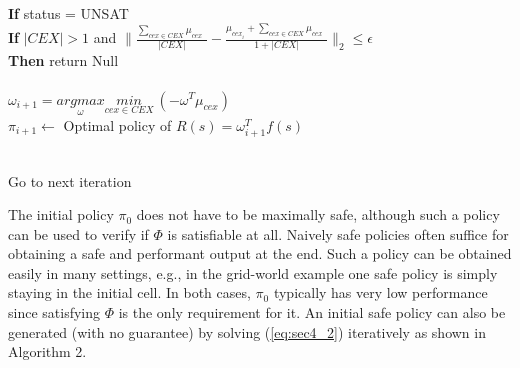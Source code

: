 \begin{algorithm}[htpb]
\begin{algorithmic}[1]
\\\qquad\qquad \textbf{If} status = UNSAT
\\\qquad\qquad\qquad \textbf{If} $|CEX|>1$ and $\|\frac{\underset{cex \in CEX}{\sum}\mu_{cex}\ \ }{|CEX|}-\frac{\mu_{cex_i} + \underset{cex \in CEX}{\sum}\mu_{cex}\ \ }{1 + |CEX|}\|_2\leq\epsilon$
\\\qquad\qquad\qquad\qquad  \textbf{Then} return Null\\
\\\qquad\qquad $\omega_{i+1} = \underset{\omega}{argmax} \underset{cex\in CEX}{min}\ (-\omega^T\mu_{cex})$
\\\qquad\qquad $\pi_{i+1}\gets$ Optimal policy of $R(s)=\omega_{i+1}^Tf(s)$

\\\qquad Go to next iteration

\end{algorithmic}
\end{algorithm}

\begin{remark}
The initial policy $\pi_0$ does not have to be maximally safe, although such a policy can be used to verify if $\Phi$ is  satisfiable at all. 
Naively safe policies often suffice for obtaining a safe and performant output at the end. Such a policy can be obtained easily in many settings, e.g., in the grid-world example one safe policy is simply staying in the initial cell. 
In both cases, $\pi_0$ typically has very low performance since satisfying $\Phi$ is the only requirement for it. An initial safe policy can also be generated (with no guarantee) by solving (\ref{eq:sec4_2}) iteratively as shown in Algorithm 2.
\end{remark}

